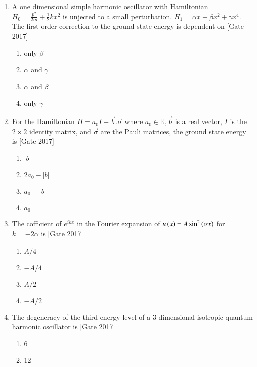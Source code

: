 \documentclass[journal]{IEEEtran}
\begin{document}
\begin{enumerate}
	\item A one dimensional simple harmonic oscillator with Hamiltonian $H_0 = \frac{p^2}{2m} + \frac{1}{2}kx^2$ is unjected to a small perturbation. $H_1 = \alpha x + \beta x^2 + \gamma x^4$. The first order correction to the ground state energy is dependent on \hfill{[Gate 2017]}
	\begin{multicols}{4}
	\begin{enumerate}
		\item only $\beta$
		\item $\alpha$ and $\gamma$
		\item $\alpha$ and $\beta$
		\item only $\gamma$
	\end{enumerate}
\end{multicols}
	\item For the Hamiltonian $H = a_0 I + \overrightarrow b.\overrightarrow \sigma$ where $a_0 \in \mathbb{R}, \overrightarrow b$ is a real vector, $I$ is the $2 \times 2$ identity matrix, and $\overrightarrow \sigma$ are the Pauli matrices, the ground state energy is \hfill{[Gate 2017]}
	\begin{multicols}{4}
	\begin{enumerate}
		\item $|b|$
		\item $2a_0 - |b|$
		\item $a_0 - |b|$
		\item $a_0$
	\end{enumerate}
\end{multicols}
	\item The cofficient of $e^{ikx}$ in the Fourier expansion of $u\left(x\right) = A \sin^{2}\left(\alpha x\right)$ for $k = -2\alpha$ is \hfill{[Gate 2017]}
	\begin{multicols}{4}
	\begin{enumerate}
		\item $A/4$
		\item $-A/4$
		\item $A/2$
		\item $-A/2$
	\end{enumerate}
\end{multicols}
	\item The degeneracy of the third energy level of a 3-dimensional isotropic quantum harmonic oscillator is \hfill{[Gate 2017]}
	\begin{multicols}{4}
	\begin{enumerate}
		\item 6
		\item 12

\end{enumerate}
\end{multicols}
\end{enumerate}
\end{document}
